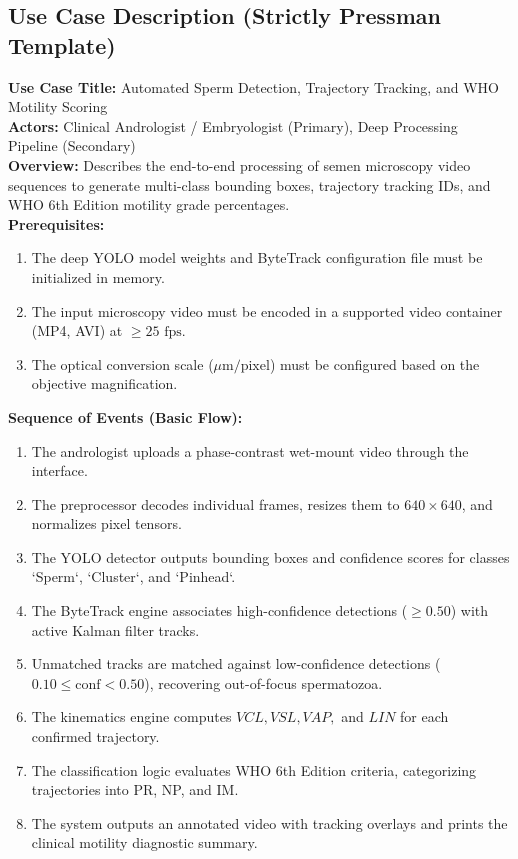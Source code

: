 \documentclass[12pt,a4paper]{report}
\begin{document}
\subsection{Use Case Description (Strictly Pressman Template)}
\noindent \textbf{Use Case Title:} Automated Sperm Detection, Trajectory Tracking, and WHO Motility Scoring \\[0.2cm]
\textbf{Actors:} Clinical Andrologist / Embryologist (Primary), Deep Processing Pipeline (Secondary) \\[0.2cm]
\textbf{Overview:} Describes the end-to-end processing of semen microscopy video sequences to generate multi-class bounding boxes, trajectory tracking IDs, and WHO 6th Edition motility grade percentages. \\[0.2cm]
\textbf{Prerequisites:}
\begin{enumerate}
    \item The deep YOLO model weights and ByteTrack configuration file must be initialized in memory.
    \item The input microscopy video must be encoded in a supported video container (MP4, AVI) at $\ge 25\text{ fps}$.
    \item The optical conversion scale ($\mu\text{m/pixel}$) must be configured based on the objective magnification.
\end{enumerate}
\textbf{Sequence of Events (Basic Flow):}
\begin{enumerate}
    \item The andrologist uploads a phase-contrast wet-mount video through the interface.
    \item The preprocessor decodes individual frames, resizes them to $640 \times 640$, and normalizes pixel tensors.
    \item The YOLO detector outputs bounding boxes and confidence scores for classes `Sperm`, `Cluster`, and `Pinhead`.
    \item The ByteTrack engine associates high-confidence detections ($\ge 0.50$) with active Kalman filter tracks.
    \item Unmatched tracks are matched against low-confidence detections ($0.10 \le \text{conf} < 0.50$), recovering out-of-focus spermatozoa.
    \item The kinematics engine computes $VCL, VSL, VAP,$ and $LIN$ for each confirmed trajectory.
    \item The classification logic evaluates WHO 6th Edition criteria, categorizing trajectories into PR, NP, and IM.
    \item The system outputs an annotated video with tracking overlays and prints the clinical motility diagnostic summary.
\end{enumerate}
\end{document}
